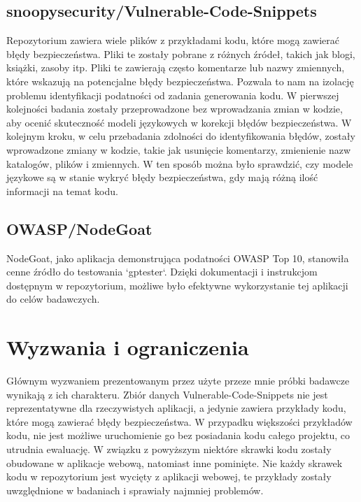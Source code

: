 \subsection{snoopysecurity/Vulnerable-Code-Snippets} 
Repozytorium zawiera wiele plików z przykładami kodu, które mogą zawierać błędy bezpieczeństwa. Pliki te zostały pobrane z różnych źródeł, takich jak blogi, książki, zasoby itp. Pliki te zawierają często komentarze lub nazwy zmiennych, które wskazują na potencjalne błędy bezpieczeństwa. Pozwala to nam na izolację problemu identyfikacji podatności od zadania generowania kodu. W pierwszej kolejności badania zostały przeprowadzone bez wprowadzania zmian w kodzie, aby ocenić skuteczność modeli językowych w korekcji błędów bezpieczeństwa. W kolejnym kroku, w celu przebadania zdolności do identyfikowania błędów, zostały wprowadzone zmiany w kodzie, takie jak usunięcie komentarzy, zmienienie nazw katalogów, plików i zmiennych. W ten sposób można było sprawdzić, czy modele językowe są w stanie wykryć błędy bezpieczeństwa, gdy mają różną ilość informacji na temat kodu.



\subsection{OWASP/NodeGoat}
NodeGoat, jako aplikacja demonstrująca podatności OWASP Top 10, stanowiła cenne źródło do testowania `gptester`. Dzięki dokumentacji i instrukcjom dostępnym w repozytorium, możliwe było efektywne wykorzystanie tej aplikacji do celów badawczych.

\section{Wyzwania i ograniczenia}
\label{sec:wyzwania_i_ograniczenia}

Głównym wyzwaniem prezentowanym przez użyte przeze mnie próbki badawcze wynikają z ich charakteru. Zbiór danych Vulnerable-Code-Snippets nie jest reprezentatywne dla rzeczywistych aplikacji, a jedynie zawiera przykłady kodu, które mogą zawierać błędy bezpieczeństwa. W przypadku większości przykładów kodu, nie jest możliwe uruchomienie go bez posiadania kodu całego projektu, co utrudnia ewaluację. W związku z powyższym niektóre skrawki kodu zostały obudowane w aplikacje webową, natomiast inne pominięte. Nie każdy skrawek kodu w repozytorium jest wycięty z aplikacji webowej, te przykłady zostały uwzględnione w badaniach i sprawiały najmniej problemów. 


